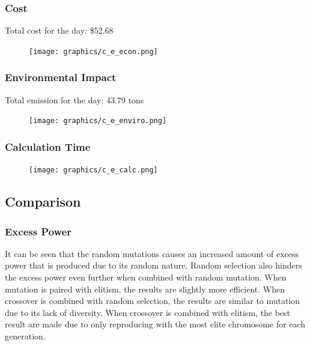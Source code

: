 \documentclass{article}
\begin{document}
        \subsubsection{Cost}
            Total cost for the day: \$52.68
            \begin{figure}[h!]
                \begin{center}
                    \texttt{[image: graphics/c\_e\_econ.png]}
                \end{center}
                \label{fig:CEcost}
            \end{figure}
        \newpage   
        \subsubsection{Environmental Impact}
            Total emission for the day: 43.79 tons
            \begin{figure}[h!]
                \begin{center}
                    \texttt{[image: graphics/c\_e\_enviro.png]}
                \end{center}
                \label{fig:CEemissions}
            \end{figure}
        
        \subsubsection{Calculation Time}
            \begin{figure}[h!]
                \begin{center}
                    \texttt{[image: graphics/c\_e\_calc.png]}
                \end{center}
                \label{fig:CEcalc}
            \end{figure}
            
    
    \newpage
    \subsection{Comparison}
    \subsubsection{Excess Power}
        It can be seen that the random mutations causes an increased amount of excess power that is produced due to its random nature.  Random selection also hinders the excess power even further when combined with random mutation. When mutation is paired with elitism, the results are slightly more efficient.  When crossover is combined with random selection, the results are similar to mutation due to its lack of diversity.  When crossover is combined with elitism, the best result are made due to only reproducing with the most elite chromosome for each generation.
    
\end{document}
